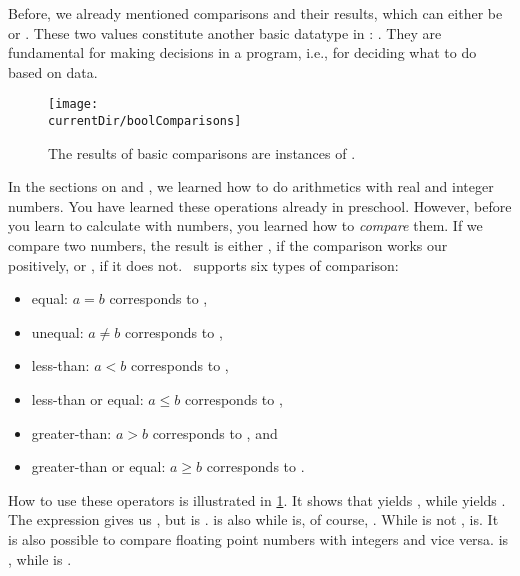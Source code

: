 %
\label{sec:bool}%
%
Before, we already mentioned comparisons and their results, which can either be  or .
These two values constitute another basic datatype in \python: .
They are fundamental for making decisions in a program, i.e., for deciding what to do based on data.
%
%
%
\begin{figure}%
\centering%
\texttt{[image: \\currentDir/boolComparisons]}%
\caption{The results of basic comparisons are instances of .}%
\label{fig:boolComparisons}%
\end{figure}%
%
In the sections on  and , we learned how to do arithmetics with real and integer numbers.
You have learned these operations already in preschool.
However, before you learn to calculate with numbers, you learned how to \emph{compare} them.
If we compare two numbers, the result is either , if the comparison works our positively, or , if it does not.
\python\ supports six types of comparison:%
%
\begin{itemize}%
%
\item equal: $a = b$ corresponds to \pythonIdx{==},%
\item unequal: $a \neq b$ corresponds to ,%
\item less-than: $a < b$ corresponds to \pythonIdx{<},%
\item less-than or equal: $a \leq b$ corresponds to \pythonIdx{<=},%
\item greater-than: $a > b$ corresponds to \pythonIdx{>}, and%
\item greater-than or equal: $a \geq b$ corresponds to \pythonIdx{>=}.%
%
\end{itemize}%
%
How to use these operators is illustrated in \cref{fig:boolComparisons}.
It shows that \pythonIdx{==} yields , while  yields .
The expression \pythonIdx{>} gives us , but \pythonIdx{>=} is .
\pythonIdx{<} is also  while  is, of course, .
While \pythonIdx{>} is not , \pythonIdx{>} is.
It is also possible to compare floating point numbers with integers and vice versa.
\pythonIdx{==} is , while  is .

